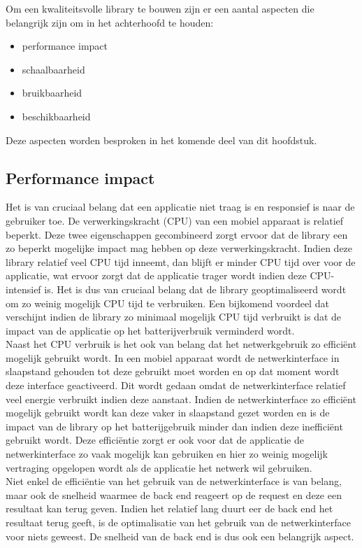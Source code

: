 Om een kwaliteitsvolle library te bouwen zijn er een aantal aspecten die belangrijk zijn om in het achterhoofd te houden:
\begin{itemize}
\item performance impact
\item schaalbaarheid
\item bruikbaarheid
\item beschikbaarheid
\end{itemize}

Deze aspecten worden besproken in het komende deel van dit hoofdstuk. 

\subsection{Performance impact}
Het is van cruciaal belang dat een applicatie niet traag is en responsief is naar de gebruiker toe. De verwerkingskracht (CPU) van een mobiel apparaat is relatief beperkt. Deze twee eigenschappen gecombineerd zorgt ervoor dat de library een zo beperkt mogelijke impact mag hebben op deze verwerkingskracht. Indien deze library relatief veel CPU tijd inneemt, dan blijft er minder CPU tijd over voor de applicatie, wat ervoor zorgt dat de applicatie trager wordt indien deze CPU-intensief is. Het is dus van cruciaal belang dat de library geoptimaliseerd wordt om zo weinig mogelijk CPU tijd te verbruiken. Een bijkomend voordeel dat verschijnt indien de library zo minimaal mogelijk CPU tijd verbruikt is dat de impact van de applicatie op het batterijverbruik verminderd wordt.  \\

Naast het CPU verbruik is het ook van belang dat het netwerkgebruik zo effici\"ent mogelijk gebruikt wordt. In een mobiel apparaat wordt de netwerkinterface in slaapstand gehouden tot deze gebruikt moet worden en op dat moment wordt deze interface geactiveerd. Dit wordt gedaan omdat de netwerkinterface relatief veel energie verbruikt indien deze aanstaat. Indien de netwerkinterface zo effici\"ent mogelijk gebruikt wordt kan deze vaker in slaapstand gezet worden en is de impact van de library op het batterijgebruik minder dan indien deze ineffici\"ent gebruikt wordt. Deze effici\"entie zorgt er ook voor dat de applicatie de netwerkinterface zo vaak mogelijk kan gebruiken en hier zo weinig mogelijk vertraging opgelopen wordt als de applicatie het netwerk wil gebruiken. \\

Niet enkel de effici\"entie van het gebruik van de netwerkinterface is van belang, maar ook de snelheid waarmee de back end reageert op de request en deze een resultaat kan terug geven. Indien het relatief lang duurt eer de back end het resultaat terug geeft, is de optimalisatie van het gebruik van de netwerkinterface voor niets geweest. De snelheid van de back end is dus ook een belangrijk aspect. \\

